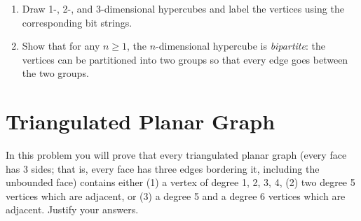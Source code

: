 \documentclass[11pt, notitlepage]{report}
\newcommand{\Question}[1]{\newpage\section{#1}}
\begin{document}
\begin{enumerate}
\item Draw 1-, 2-, and 3-dimensional hypercubes and label the vertices using the corresponding bit strings.

\nosolspace{1in}



\item Show that for any $n\ge 1$, the $n$-dimensional hypercube is \emph{bipartite}: the vertices can be partitioned into two groups so that every edge goes between the two groups.

\nosolspace{1in}

\end{enumerate}


\Question {Triangulated Planar Graph}
In this problem you will prove that every triangulated planar graph (every face has 3 sides; that is, every face has three edges bordering it, including the unbounded face)
contains either (1) a vertex of degree 1, 2, 3, 4, (2) two degree 5 vertices 
which are adjacent, or (3) a degree 5 and a degree 6 vertices which are 
adjacent. Justify your answers.
\end{document}
